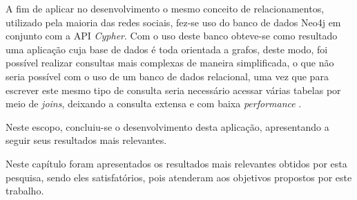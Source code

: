 \par A fim de aplicar no desenvolvimento o mesmo conceito de relacionamentos, utilizado pela maioria das redes sociais, fez-se uso do banco de dados Neo4j em conjunto com a API \textit{Cypher}. Com o uso deste banco obteve-se como resultado uma aplicação cuja base de dados é toda orientada a grafos, deste modo, foi possível realizar consultas mais complexas de maneira simplificada, o que não seria possível com o uso de um banco de dados relacional, uma vez que para escrever este mesmo tipo de consulta seria necessário acessar várias tabelas por meio de \textit{joins}, deixando a consulta extensa e com baixa \textit{performance} \cite{sadalage_fowler_nosql_distilled_brief_guide}.

\par Neste escopo, concluiu-se o desenvolvimento desta aplicação, apresentando a seguir seus resultados mais relevantes.













\par Neste capítulo foram apresentados os resultados mais relevantes obtidos por esta pesquisa, sendo eles satisfatórios, pois atenderam aos objetivos propostos por este trabalho.